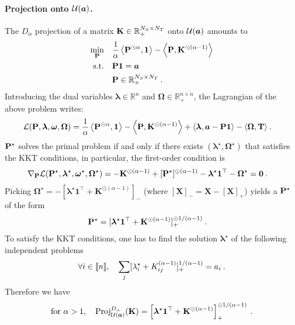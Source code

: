     \paragraph{Projection onto ${\mathcal{U}}(\bm{a})$.} The $D_\alpha$ projection of a matrix ${\mathbf{K}} \in \mathbb{R}_+^{N_S \times N_T}$ onto ${\mathcal{U}}(\bm{a})$ amounts to
    \begin{align}
        \min_{{\mathbf{P}}} \quad &\frac{1}{\alpha} \left\langle {\mathbf{P}}^{\odot \alpha}, \bm{1} \right\rangle - \left\langle {\mathbf{P}}, {\mathbf{K}}^{\odot (\alpha-1)} \right\rangle \\
        \text{s.t.} \quad &{\mathbf{P}} \bm{1} = \bm{a} \\
        & {\mathbf{P}} \in \mathbb{R}_+^{N_S \times N_T} \:.
    \end{align}
    Introducing the dual variables $\bm{\lambda} \in \mathbb{R}^n$ and $\bm{\Omega} \in \mathbb{R}_+^{n \times n}$, the Lagrangian of the above problem writes:
    \begin{align}
        \mathcal{L}({\mathbf{P}}, \bm{\lambda}, \bm{\omega}, \bm{\Omega}) &=  \frac{1}{\alpha} \left\langle {\mathbf{P}}^{\odot \alpha}, \bm{1} \right\rangle - \left\langle {\mathbf{P}}, {\mathbf{K}}^{\odot (\alpha-1)} \right\rangle + \langle \bm{\lambda}, \bm{a} - {\mathbf{P}} \bm{1} \rangle - \langle \bm{\Omega}, {\mathbf{T}} \rangle \:.
    \end{align}
    ${\mathbf{P}}^\star$ solves the primal problem if and only if there exists $(\bm{\lambda}^\star, \bm{\Omega}^\star)$ that satisfies the KKT conditions, in particular, the first-order condition is
    \begin{align}
        \nabla_{{\mathbf{P}}} \mathcal{L} ({\mathbf{P}}^\star, \bm{\lambda}^\star, \bm{\omega}^\star, \bm{\Omega}^\star) &= - \mathbf{K}^{\odot(\alpha-1)} + [{\mathbf{P}}^\star]^{\odot (\alpha - 1)} - \bm{\lambda}^\star \bm{1}^\top - \bm{\Omega}^\star = \bm{0} \:.
    \end{align}
    Picking $\bm{\Omega}^\star = -[\bm{\lambda}^\star \bm{1}^\top + \mathbf{K}^{\odot(\alpha-1)}]_{-}$ (where $[\mathbf{X}]_{-} = \mathbf{X} - [\mathbf{X}]_{+}$) yields a ${\mathbf{P}}^\star$ of the form
    \begin{align}
        {\mathbf{P}}^\star &= [\bm{\lambda}^\star \bm{1}^\top + \mathbf{K}^{\odot(\alpha-1)}]_+^{\odot 1/(\alpha-1)} \:.
    \end{align}
    To satisfy the KKT conditions, one has to find the solution $\bm{\lambda}^\star$ of the following independent problems 
    \begin{align}
        \forall i \in {[\![n]\!]}, \quad \sum_j [\lambda^\star_i + K_{ij}^{(\alpha-1)}]_+^{1/(\alpha-1)} =  a_i \:.
    \end{align}
Therefore we have
    \begin{align}
        \text{for } \alpha>1, \quad \operatorname{Proj}^{D_{\alpha}}_{{\mathcal{U}}(\bm{a})}({\mathbf{K}}) = \left[\bm{\lambda}^\star \bm{1}^\top + {\mathbf{K}}^{\odot(\alpha-1)}\right]_+^{\odot 1/(\alpha-1)} \:.
    \end{align}

